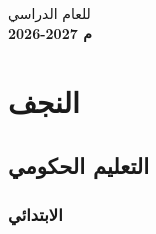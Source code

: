 \documentclass[
]{report}
\begin{document}
\begin{titlepage}
\begin{center}
    \vfill

    \begin{flushright}
        \hspace*{4.5cm} 
        \begin{minipage}{0.4\textwidth}
            \begin{Arabic}
                \begin{flushright}
                    {\Large للعام الدراسي} \\
                    \vspace{0.1cm}
                    {\color{myblue}\fontsize{42}{48}\selectfont \textbf{2026-2027 م}}
                \end{flushright}
            \end{Arabic}
        \end{minipage}
    \end{flushright}
\end{center}

\thispagestyle{empty}
\end{titlepage}

\newpage
\tableofcontents
\thispagestyle{empty} 
\newpage

\chapter{النجف}
\newpage
\section{التعليم الحكومي}
\subsection{الابتدائي}
\end{document}
